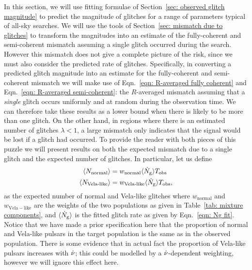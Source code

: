 \documentclass[../full_thesis/full_thesis.tex]{subfiles}
\begin{document}
In this section, we will use fitting formulae of Section~\ref{sec: observed glitch
magnitude} to predict the magnitude of glitches for a range of parameters
typical of all-sky searches. We will use the tools of Section~\ref{sec: mismatch
due to glitches} to transform the magnitudes into an estimate of the
fully-coherent and semi-coherent mismatch assuming a single glitch occurred
during the search. However this mismatch does not give a complete picture of
the risk, since we must also consider the predicted rate of glitches.
Specifically, in converting a predicted glitch magnitude into an estimate for
the fully-coherent and semi-coherent mismatch we will make use of
Eqn.~\eqref{eqn: R-averaged fully coherent} and Eqn.~\eqref{eqn: R-averaged
semi-coherent}: the $R$-averaged mismatch assuming that a \emph{single} glitch
occurs uniformly and at random during the observation time. We can therefore
take these results as a lower bound when there is likely to be more than one
glitch. On the other hand, in regions where there is an estimated number of
glitches $\lambda < 1$, a large mismatch only indicates that the signal would
be lost if a glitch had occurred. To provide the reader with both pieces of
this puzzle we will present results on both the expected mismatch due to a
single glitch and the expected number of glitches. In particular, let us define
\begin{align}
\begin{split}
\langle N_{\textrm{normal}} \rangle & = w_\textrm{normal}\langle \dot{N}_{\textrm{g}}\rangle T_{\mathrm{obs}} \\
\langle N_{\textrm{Vela-like}} \rangle & = w_\textrm{Vela-like}\langle \dot{N}_{\textrm{g}}\rangle T_{\mathrm{obs}},
\end{split}
\label{eqn: N}
\end{align}
as the expected number of normal and Vela-like glitches where $w_\mathrm{normal}$
and $w_\mathrm{Vela-like}$ are the weights of the two populations as given in
Table~\ref{tab: mixture components}, and $\langle \dot{N}_{\textrm{g}}\rangle$ is the fitted glitch rate as
given by Eqn.~\eqref{eqn: Ng fit}. Notice that we have made a prior specification
here that the proportion of normal and Vela-like pulsars in the target population
is the same as in the observed population. There is some evidence that in actual
fact the proportion of Vela-like pulsars increases with $\dot{\nu}$; this could
be modelled by a $\dot{\nu}$-dependent weighting, however we will ignore this
effect here.
\end{document}
